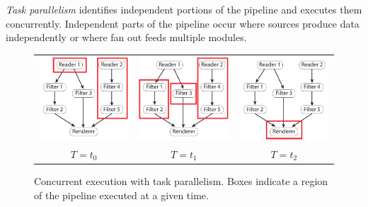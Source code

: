 \documentclass[journal,onecolumn,12pt,letterpaper,twoside]{IEEEtran}
\newcommand*{\keyterm}[1]{\emph{#1}}
\begin{document}
\keyterm{Task parallelism} identifies independent portions of the pipeline
and executes them concurrently.  Independent parts of the pipeline occur
where sources produce data independently or where fan out feeds multiple
modules.

\begin{figure}[htbp]
  \centering
  \begin{tabular}{@{}c@{\qquad}c@{\qquad}c@{}}
    \includegraphics[scale=1]{images/TaskParallel0} &
    \includegraphics[scale=1]{images/TaskParallel1} &
    \includegraphics[scale=1]{images/TaskParallel2} \\
    $T = t_0$ & $T = t_1$ & $T = t_2$
  \end{tabular}
  \caption{Concurrent execution with task parallelism.  Boxes indicate a
    region of the pipeline executed at a given time.}
  \label{fig:TaskParallelism}
\end{figure}
\end{document}
